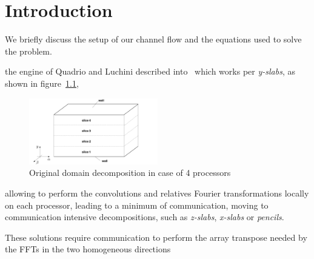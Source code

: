 \chapter{Introduction}
\pagestyle{headings}

We briefly discuss the setup of our channel flow and the equations used to solve the problem.



the engine of Quadrio and Luchini described into~\cite{cpl:presentazione} which works per \emph{y-slabs}, as shown in figure~\ref{domain_decomp},
\begin{figure}
\includegraphics[width=0.5\textwidth]{grafici/decomp_dominio_cpl}
\caption{Original domain decomposition in case of 4 processors}
\label{domain_decomp}
\end{figure} allowing to perform the convolutions and relatives Fourier transformations locally on each processor, leading to a minimum of communication, moving to communication intensive decompositions, such as \emph{z-slabs}, \emph{x-slabs} or \emph{pencils}.

These solutions require communication to perform the array transpose needed by the FFTs in the two homogeneous directions